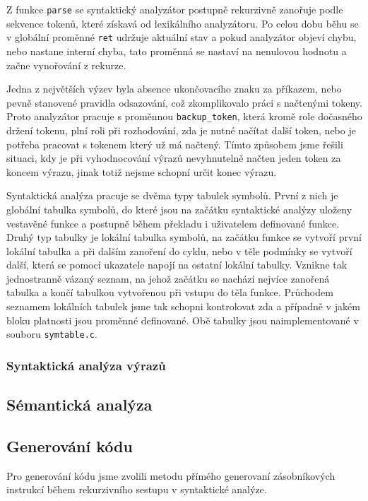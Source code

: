 \documentclass[11pt]{article}
\begin{document}
 Z funkce \texttt{parse} se
 syntaktický analyzátor postupně rekurzivně zanořuje podle sekvence tokenů, které získavá od lexikálního analyzátoru. Po celou
 dobu běhu se v globální proměnné \texttt{ret} udržuje aktuální stav a pokud analyzátor objeví chybu, nebo nastane interní chyba,
 tato proměnná se nastaví na nenulovou hodnotu a začne vynořování z rekurze.

 Jedna z největších výzev byla absence ukončovacího
 znaku za příkazem, nebo pevně stanovené pravidla odsazování, což zkomplikovalo práci s načtenými tokeny. Proto analyzátor pracuje
 s proměnnou \texttt{backup\_token}, která kromě role dočasného držení tokenu, plní roli při rozhodování, zda je nutné načítat
 další token, nebo je potřeba pracovat s tokenem který už má načtený. Tímto způsobem jsme řešili situaci, kdy je při
 vyhodnocování výrazů nevyhnutelně načten jeden token za koncem výrazu, jinak totiž nejsme schopní určit konec výrazu.

 Syntaktická analýza pracuje se dvěma typy tabulek symbolů. První z nich je globální tabulka symbolů, do které jsou na začátku
 syntaktické analýzy uloženy vestavěné funkce a postupně během překladu i uživatelem definované funkce. Druhý typ tabulky je lokální
 tabulka symbolů, na začátku funkce se vytvoří první lokální tabulka a při dalším zanoření do cyklu, nebo v těle podmínky se vytvoří
 další, která se pomocí ukazatele napojí na ostatní lokální tabulky. Vznikne tak jednostranně vázaný seznam, na jehož začátku se nachází
 nejvíce zanořená tabulka a končí tabulkou vytvořenou při vstupu do těla funkce. Průchodem seznamem lokálních tabulek jsme tak
 schopni kontrolovat zda a případně v jakém bloku platnosti jsou proměnné definované. Obě tabulky jsou naimplementované v souboru
 \texttt{symtable.c}.

\subsubsection{Syntaktická analýza výrazů}

\subsection{Sémantická analýza}

\subsection{Generování kódu}
Pro generování kódu jsme zvolili metodu přímého generovaní zásobníkových instrukcí během rekurzivního sestupu v syntaktické analýze.
\end{document}
